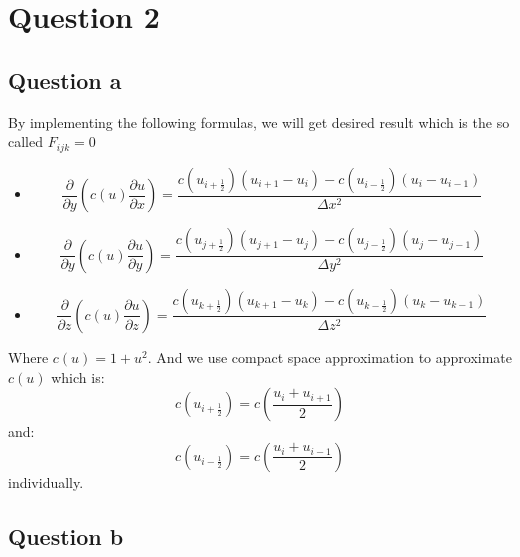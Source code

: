 \documentclass[11pt]{article}
\begin{document}
    
    \section{Question 2}
    \subsection{Question a}
    By implementing the following formulas, we will get desired result which is the so called $F_{ijk} = 0$
    
    \begin{itemize}
    
    \item
    \begin{equation}
    \label{eq:x_dim}
    \frac{\partial}{\partial y}\left( c(u)\frac{\partial u}{\partial x}\right ) = \frac{c(u_{i+\frac{1}{2}})(u_{i+1}-u_i)-c(u_{i-\frac{1}{2}})(u_i-u_{i-1})}{\Delta x^2}
    \end{equation}
    
    \item
    \begin{equation}
    \label{eq:y_dim}
    \frac{\partial}{\partial y}\left( c(u)\frac{\partial u}{\partial y}\right ) = \frac{c(u_{j+\frac{1}{2}})(u_{j+1}-u_j)-c(u_{j-\frac{1}{2}})(u_j-u_{j-1})}{\Delta y^2}
    \end{equation}
    
    \item 
    \begin{equation}
    \label{eq:z_dim}
    \frac{\partial}{\partial z}\left( c(u)\frac{\partial u}{\partial z}\right ) = \frac{c(u_{k+\frac{1}{2}})(u_{k+1}-u_k)-c(u_{k-\frac{1}{2}})(u_k-u_{k-1})}{\Delta z^2}
    \end{equation}

    \end{itemize}
    
    Where $c(u)=1+u^2$. And we use compact space approximation to approximate $c(u)$ which is:
    \begin{equation}
    \label{eq:u+1/2}
    c(u_{i+\frac{1}{2}})=c\left(\frac{u_i+u_{i+1}}{2}\right)
    \end{equation}
    and:
    \begin{equation}
    \label{eq:u-1/2}
    c(u_{i-\frac{1}{2}})=c\left(\frac{u_i+u_{i-1}}{2}\right)
    \end{equation}
    individually.
    
    
    \subsection{Question b}
    
\end{document}

